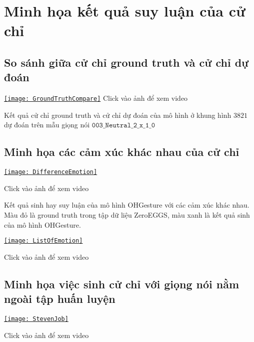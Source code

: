 \chapter{Minh họa kết quả suy luận của cử chỉ}
\label{Appendix3}

\section{So sánh giữa cử chỉ ground truth và cử chỉ dự đoán}


\begin{center}
\centering
\href{https://youtu.be/22lNm2tvmrk}{%
\texttt{[image: GroundTruthCompare]}}
{\tiny Click vào ảnh để xem video}
\end{center}

Kết quả cử chỉ ground truth và cử chỉ dự đoán của mô hình ở khung hình $3821$ dự đoán trên mẫu giọng nói $\texttt{003\_Neutral\_2\_x\_1\_0}$

\section{Minh họa các cảm xúc khác nhau của cử chỉ}

{
	\begin{center}
		\centering
		\href{https://youtu.be/KUlBZXLtYJ4}{%
			\texttt{[image: DifferenceEmotion]}}
		
		{\tiny Click vào ảnh để xem video}
	\end{center}
}

Kết quả sinh hay suy luận của mô hình OHGesture với các cảm xúc khác nhau. Màu đỏ là ground truth trong tập dữ liệu ZeroEGGS, màu xanh là kết quả sinh của mô hình OHGesture.

{
	\begin{center}
		\centering
		\href{https://youtu.be/eZghfNGmZn8}{%
			\texttt{[image: ListOfEmotion]}}
		
		{\tiny Click vào ảnh để xem video}
	\end{center}
}

\section{Minh họa việc sinh cử chỉ với giọng nói nằm ngoài tập huấn luyện}

{
	\begin{center}
		\centering
		\href{https://www.youtube.com/watch?v=B6nv1kQmi-Q}{%
		\texttt{[image: StevenJob]}}
		
		{\tiny Click vào ảnh để xem video}
	\end{center}
}

